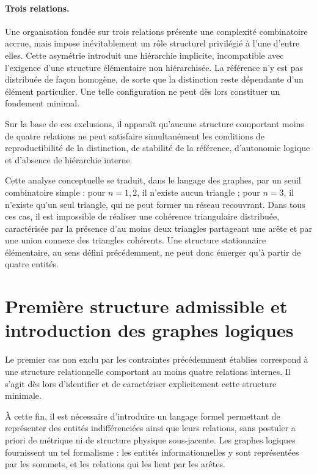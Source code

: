 \documentclass[11pt,a4paper]{article}
\begin{document}
\paragraph{Trois relations.}
Une organisation fondée sur trois relations présente une complexité combinatoire accrue, mais impose inévitablement un rôle structurel privilégié à l’une d’entre elles. Cette asymétrie introduit une hiérarchie implicite, incompatible avec l’exigence d’une structure élémentaire non hiérarchisée. La référence n’y est pas distribuée de façon homogène, de sorte que la distinction reste dépendante d’un élément particulier. Une telle configuration ne peut dès lors constituer un fondement minimal.

Sur la base de ces exclusions, il apparaît qu’aucune structure comportant moins de quatre relations ne peut satisfaire simultanément les conditions de reproductibilité de la distinction, de stabilité de la référence, d’autonomie logique et d’absence de hiérarchie interne.

Cette analyse conceptuelle se traduit, dans le langage des graphes, par un seuil combinatoire simple : pour \(n = 1,2\), il n’existe aucun triangle ; pour \(n = 3\), il n’existe qu’un seul triangle, qui ne peut former un réseau recouvrant. Dans tous ces cas, il est impossible de réaliser une cohérence triangulaire distribuée, caractérisée par la présence d’au moins deux triangles partageant une arête et par une union connexe des triangles cohérents. Une structure stationnaire élémentaire, au sens défini précédemment, ne peut donc émerger qu’à partir de quatre entités.

\section{Première structure admissible et introduction des graphes logiques}

Le premier cas non exclu par les contraintes précédemment établies correspond à une structure relationnelle comportant au moins quatre relations internes. Il s’agit dès lors d’identifier et de caractériser explicitement cette structure minimale.

À cette fin, il est nécessaire d’introduire un langage formel permettant de représenter des entités indifférenciées ainsi que leurs relations, sans postuler a priori de métrique ni de structure physique sous‑jacente. Les graphes logiques fournissent un tel formalisme : les entités informationnelles y sont représentées par les sommets, et les relations qui les lient par les arêtes.
\end{document}
